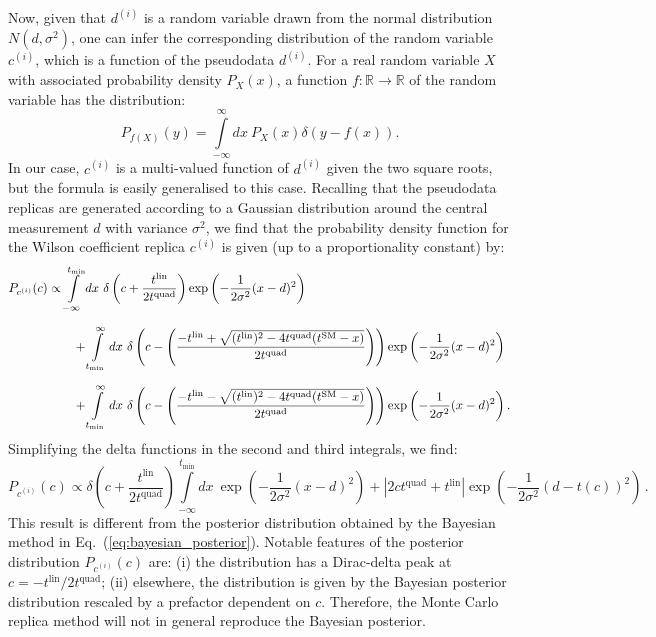 \documentclass[withindex,glossary]{cam-thesis}
\begin{document}
Now, given that $d^{(i)}$ is a random variable drawn from the normal distribution $N(d,\sigma^2)$, one can infer the corresponding distribution of the random variable $c^{(i)}$, which is a function of the pseudodata $d^{(i)}$.
%
For a real random variable $X$ with associated probability density $P_X(x)$, a function $f : \mathbb{R} \rightarrow \mathbb{R}$ of the random variable has the distribution:
\begin{equation}
P_{f(X)}(y) = \int\limits_{-\infty}^{\infty} dx\ P_X(x) \delta(y - f(x)).
\end{equation}
In our case, $c^{(i)}$ is a multi-valued function of $d^{(i)}$ given the two square roots, but the formula is easily generalised to this case.
%
Recalling that the pseudodata replicas are generated according
to a Gaussian distribution around the central measurement $d$ with variance $\sigma^2$,
we find that the probability density function for the Wilson coefficient replica
$c^{(i)}$ is given (up to a proportionality constant) by:
\begin{align}
P_{c^{(i)}}(c) &\propto \int\limits_{-\infty}^{t_{\text{min}}} dx\ \delta\left( c + \frac{t^{\text{lin}}}{2t^{\text{quad}}} \right) \exp\left( -\frac{1}{2\sigma^2} (x - d)^2 \right) \notag \\[1.5ex]
&\qquad + \int\limits_{t_{\text{min}}}^{\infty} dx\  \delta\left( c - \left(\frac{-t^{\text{lin}} + \sqrt{(t^{\text{lin}})^2 - 4t^{\text{quad}}(t^{\text{SM}} - x)}}{2t^{\text{quad}}}\right)\right)\exp\left( -\frac{1}{2\sigma^2} (x - d)^2 \right) \notag\\[1.5ex]
& \qquad + \int\limits_{t_{\text{min}}}^{\infty} dx\ \delta\left( c - \left(\frac{-t^{\text{lin}} - \sqrt{(t^{\text{lin}})^2 - 4t^{\text{quad}}(t^{\text{SM}} - x)}}{2t^{\text{quad}}}\right)\right) \exp\left( -\frac{1}{2\sigma^2} (x - d)^2 \right).
\end{align}
Simplifying the delta functions in the second and third integrals, we find:
\begin{equation}
\label{eq:mc_posterior}
P_{c^{(i)}}(c) \propto \delta\left( c + \frac{t^{\text{lin}}}{2t^{\text{quad}}} \right) \int\limits_{-\infty}^{t_{\text{min}}} dx\ \exp\left( -\frac{1}{2\sigma^2} (x - d)^2 \right) + |2ct^{\text{quad}}  + t^{\text{lin}}| \exp\left( -\frac{1}{2\sigma^2} (d - t(c))^2 \right) \, .
\end{equation}
This result is different from the posterior distribution obtained by the Bayesian method in Eq.~(\ref{eq:bayesian_posterior}). Notable features of the posterior distribution $P_{c^{(i)}}(c)$ are: (i) the distribution has a Dirac-delta peak at $c = -t^{\text{lin}}/2t^{\text{quad}}$; (ii) elsewhere, the distribution is given by the Bayesian posterior distribution rescaled by a prefactor dependent on $c$.
%
Therefore, the Monte Carlo
replica method will not in general reproduce the Bayesian posterior.
\end{document}
